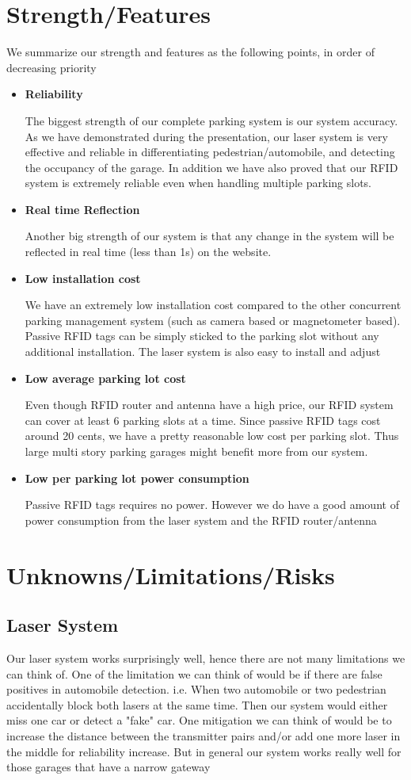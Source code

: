 \documentclass[12pt, a4paper]{article}
\begin{document}
\section{Strength/Features}
We summarize our strength and features as the following points, in order of decreasing priority
\begin{itemize}
	\item \textbf{Reliability}
	
	The biggest strength of our complete parking system is our system accuracy. As we have demonstrated during the presentation, our laser system is very effective and reliable in differentiating pedestrian/automobile, and detecting the occupancy of the garage. In addition we have also proved that our RFID system is extremely reliable even when handling multiple parking slots.
	\item \textbf{Real time Reflection}
	
	Another big strength of our system is that any change in the system will be reflected in real time (less than 1s) on the website.
	\item \textbf{Low installation cost}
	
	We have an extremely low installation cost compared to the other concurrent parking management system (such as camera based or magnetometer based). Passive RFID tags can be simply sticked to the parking slot without any additional installation. The laser system is also easy to install and adjust
	\item \textbf{Low average parking lot cost}
	
	Even though RFID router and antenna have a high price, our RFID system can cover at least 6 parking slots at a time. Since passive RFID tags cost around 20 cents, we have a pretty reasonable low cost per parking slot. Thus large multi story parking garages might benefit more from our system. 
	\item \textbf{Low per parking lot power consumption}
	
	Passive RFID tags requires no power. However we do have a good amount of power consumption from the laser system and the RFID router/antenna
\end{itemize}
\section{Unknowns/Limitations/Risks}
\label{sec:limit}
\subsection{Laser System}
Our laser system works surprisingly well, hence there are not many limitations we can think of. One of the limitation we can think of would be if there are false positives in automobile detection. i.e. When two automobile or two pedestrian accidentally block both lasers at the same time. Then our system would either miss one car or detect a "fake" car. One mitigation we can think of would be to increase the distance between the transmitter pairs and/or add one more laser in the middle for reliability increase. But in general our system works really well for those garages that have a narrow gateway
\end{document}
